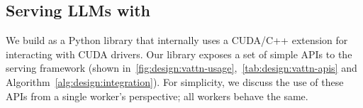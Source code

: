 \begin{table}[t!]
    \centering
    \caption{Key APIs that \sysname exposes to a serving framework for dynamic \kvcache memory management.}
    \label{tab:design:vattn-apis}
\end{table}


\subsection{Serving LLMs with \sysname}
\label{sec:design:serving-llms}

We build \sysname as a Python library that internally uses a CUDA/C++ extension for interacting with CUDA drivers. Our library exposes a set of simple APIs to the serving framework (shown in~\autoref{fig:design:vattn-usage},~\autoref{tab:design:vattn-apis} and Algorithm~\autoref{alg:design:integration}). For simplicity, we discuss the use of these APIs from a single worker's perspective; all workers behave the same.


